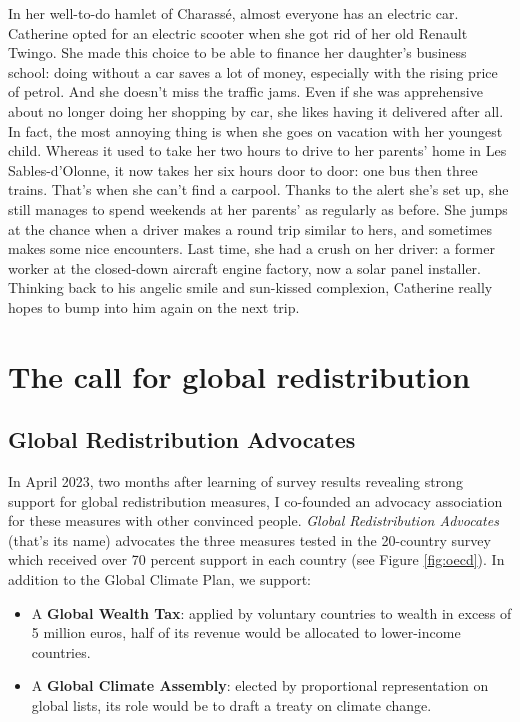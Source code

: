 \documentclass[a5paper,english,openany]{memoir}
\begin{document}
In her well-to-do hamlet of Charassé, almost everyone has an electric car. Catherine opted for an electric scooter when she got rid of her old Renault Twingo. She made this choice to be able to finance her daughter's business school: doing without a car saves a lot of money, especially with the rising price of petrol. And she doesn't miss the traffic jams. Even if she was apprehensive about no longer doing her shopping by car, she likes having it delivered after all. In fact, the most annoying thing is when she goes on vacation with her youngest child. Whereas it used to take her two hours to drive to her parents' home in Les Sables-d'Olonne, it now takes her six hours door to door: one bus then three trains. That's when she can't find a carpool. Thanks to the alert she's set up, she still manages to spend weekends at her parents' as regularly as before. She jumps at the chance when a driver makes a round trip similar to hers, and sometimes makes some nice encounters. Last time, she had a crush on her driver: a former worker at the closed-down aircraft engine factory, now a solar panel installer. Thinking back to his angelic smile and sun-kissed complexion, Catherine really hopes to bump into him again on the next trip.

\chapter{The call for global redistribution\label{ch:appel}}

\section*{Global Redistribution Advocates}

In April 2023, two months after learning of survey results revealing strong support for global redistribution measures, I co-founded an advocacy association for these measures with other convinced people. \textit{Global Redistribution Advocates} (that's its name) advocates the three measures tested in the 20-country survey which received over 70 percent support in each country (see Figure \ref{fig:oecd}). In addition to the Global Climate Plan, we support: 
\begin{itemize}
  \item A \textbf{Global Wealth Tax}: applied by voluntary countries to wealth in excess of 5 million euros, half of its revenue would be allocated to lower-income countries.
  \item A \textbf{Global Climate Assembly}: elected by proportional representation on global lists, its role would be to draft a treaty on climate change.
\end{itemize}
\end{document}
